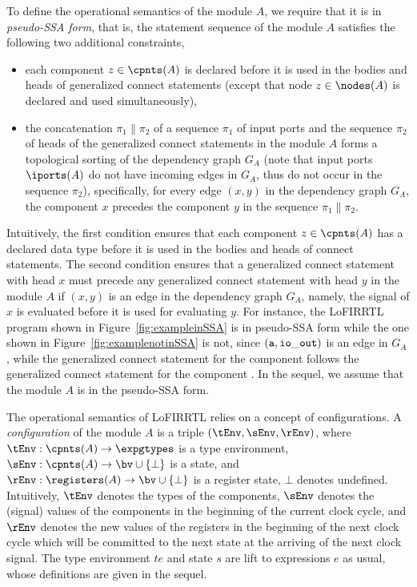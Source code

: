 To define the operational semantics of the module $A$, we require that it is in \emph{pseudo-SSA form}, that is,  the statement sequence of the module $A$ satisfies the following two additional constraints,
\begin{itemize}
\item each component $z\in \cpnts(A)$ is declared before it is used in the bodies and heads of generalized connect statements (except that node $z\in \nodes(A)$ is declared and used simultaneously),
%
\item the concatenation $\pi_1\|\pi_2$ of a sequence  $\pi_1$ of input ports and the sequence $\pi_2$ of heads of the generalized connect statements in the module $A$ forms
 a topological sorting of  the dependency graph $G_A$ (note that input ports $\iports(A)$ do not have incoming edges in $G_A$, thus
do not occur in the sequence $\pi_2$),
specifically, for every edge $(x, y)$ in the dependency graph $G_A$,
the component $x$ precedes the component $y$ in the sequence $\pi_1\|\pi_2$. %
\end{itemize}

Intuitively,
the first condition ensures that each component $z\in \cpnts(A)$ has a declared data type
before it is used in the bodies and heads of connect statements.
The second condition ensures that a generalized connect statement with head $x$
must precede any generalized connect statement with head $y$ in the module $A$ if $(x, y)$ is an edge in the dependency graph $G_A$,
namely, the signal of $x$ is evaluated before it is used for evaluating $y$.
For instance, the LoFIRRTL program shown in Figure~\ref{fig:exampleinSSA} is in
pseudo-SSA form while the one shown in Figure~\ref{fig:examplenotinSSA} is not, since
$({\tt a}, {\tt io\_out})$ is an edge in $G_A$, while
the generalized connect statement   for the component  follows
the generalized connect statement  for the component .
In the sequel, we assume that the module $A$ is in the pseudo-SSA form.




The operational semantics of LoFIRRTL relies on a concept of configurations.
A \emph{configuration} of the module $A$ is a triple $(\tEnv, \sEnv, \rEnv)$, where $\tEnv:\cpnts(A)\rightarrow \expgtypes$ is a type environment,
$\sEnv: \cpnts(A)\rightarrow \bv \cup \{\bot\}$ is a state, and $\rEnv: \registers(A)\rightarrow \bv \cup \{\bot\}$ is a register state,
$\bot$ denotes undefined.
Intuitively, $\tEnv$ denotes the types of the components, $\sEnv$ denotes the (signal) values of the components in the beginning of the current clock cycle, and $\rEnv$ denotes the new values of the registers in the beginning of the next clock cycle which will be committed to the next state at the arriving of the next clock signal.
The type environment $te$ and state $s$ are lift to expressions $e$ as usual, whose definitions are given in the sequel. %

